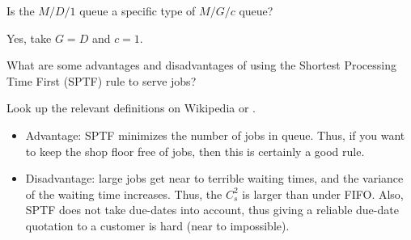 \begin{exercise}
  Is the $M/D/1$ queue a specific type of  $M/G/c$ queue? 
  \begin{solution}
    Yes, take $G=D$ and $c=1$. 
  \end{solution}
\end{exercise}

\begin{exercise}
  What are some advantages and disadvantages of using the Shortest
  Processing Time First (SPTF) rule to serve jobs? 
  \begin{hint}
Look up the relevant
  definitions on Wikipedia or
  \citet{hall91:_queuein_method_servic_manuf}.
  \end{hint}
  \begin{solution}
  \begin{itemize}
  \item Advantage: SPTF minimizes the number of jobs in queue. Thus,
    if you want to keep the shop floor free of jobs, then this is certainly a good rule. 
  \item Disadvantage: large jobs get near to terrible waiting times,
    and the variance of the waiting time increases. Thus, the $C_s^2$
    is larger than under FIFO. Also, SPTF does not take due-dates into
    account, thus giving a reliable due-date quotation to a customer is
    hard (near to impossible).
  \end{itemize}
  \end{solution}
\end{exercise}





